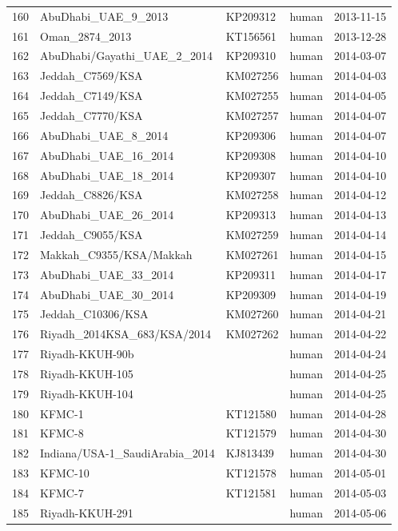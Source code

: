 \documentclass[9pt,lineno]{elife}
\begin{document}
\begin{longtable}{ | r | l | p{2cm} | l | l | }
  160 & AbuDhabi\_UAE\_9\_2013 & KP209312 & human & 2013-11-15 \\
  161 & Oman\_2874\_2013 & KT156561 & human & 2013-12-28 \\
  162 & AbuDhabi/Gayathi\_UAE\_2\_2014 & KP209310 & human & 2014-03-07 \\
  163 & Jeddah\_C7569/KSA & KM027256 & human & 2014-04-03 \\
  164 & Jeddah\_C7149/KSA & KM027255 & human & 2014-04-05 \\
  165 & Jeddah\_C7770/KSA & KM027257 & human & 2014-04-07 \\
  166 & AbuDhabi\_UAE\_8\_2014 & KP209306 & human & 2014-04-07 \\
  167 & AbuDhabi\_UAE\_16\_2014 & KP209308 & human & 2014-04-10 \\
  168 & AbuDhabi\_UAE\_18\_2014 & KP209307 & human & 2014-04-10 \\
  169 & Jeddah\_C8826/KSA & KM027258 & human & 2014-04-12 \\
  170 & AbuDhabi\_UAE\_26\_2014 & KP209313 & human & 2014-04-13 \\
  171 & Jeddah\_C9055/KSA & KM027259 & human & 2014-04-14 \\
  172 & Makkah\_C9355/KSA/Makkah & KM027261 & human & 2014-04-15 \\
  173 & AbuDhabi\_UAE\_33\_2014 & KP209311 & human & 2014-04-17 \\
  174 & AbuDhabi\_UAE\_30\_2014 & KP209309 & human & 2014-04-19 \\
  175 & Jeddah\_C10306/KSA & KM027260 & human & 2014-04-21 \\
  176 & Riyadh\_2014KSA\_683/KSA/2014 & KM027262 & human & 2014-04-22 \\
  177 & Riyadh-KKUH-90b &  & human & 2014-04-24 \\
  178 & Riyadh-KKUH-105 &  & human & 2014-04-25 \\
  179 & Riyadh-KKUH-104 &  & human & 2014-04-25 \\
  180 & KFMC-1 & KT121580 & human & 2014-04-28 \\
  181 & KFMC-8 & KT121579 & human & 2014-04-30 \\
  182 & Indiana/USA-1\_SaudiArabia\_2014 & KJ813439 & human & 2014-04-30 \\
  183 & KFMC-10 & KT121578 & human & 2014-05-01 \\
  184 & KFMC-7 & KT121581 & human & 2014-05-03 \\
  185 & Riyadh-KKUH-291 &  & human & 2014-05-06 \\

\end{longtable}
\end{document}
